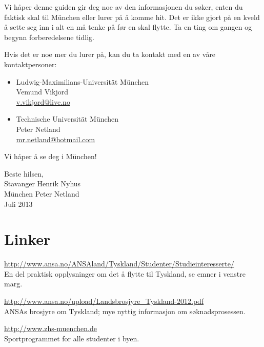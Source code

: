 \framebreak
\framebreak
\vspace{4cm}

\large
Vi håper denne guiden gir deg noe av den informasjonen du søker, enten du faktisk skal til München eller lurer på å komme hit. Det er ikke gjort på en kveld å sette seg inn i alt en må tenke på før en skal flytte. Ta en ting om gangen og begynn forberedelsene tidlig.

Hvis det er noe mer du lurer på, kan du ta kontakt med en av våre kontaktpersoner:
\begin{itemize}
\item{Ludwig-Maximilians-Universität München}\\
Vemund Vikjord \\
\href{mailto:v.vikjord@live.no}{v.vikjord@live.no} 

\item{Technische Universität München}\\
Peter Netland \\
\href{mailto:mr.netland@hotmail.com}{mr.netland@hotmail.com} 
\end{itemize}

\vspace{1cm}

Vi håper å se deg i München!


\vspace{2cm}

Beste hilsen,\\
Stavanger \hfill Henrik Nyhus \\
München \hfill Peter Netland \\
Juli 2013








\framebreak
\chapter{Linker}


\url{http://www.ansa.no/ANSAland/Tyskland/Studenter/Studieinteresserte/}\\
En del praktisk opplysninger om det å flytte til Tyskland, se emner i venstre marg.

\url{http://www.ansa.no/upload/Landsbrosjyre_Tyskland-2012.pdf} \\
ANSAs brosjyre om Tyskland; mye nyttig informasjon om søknadsprosessen.

\url{http://www.zhs-muenchen.de} \\
Sportprogrammet for alle studenter i byen.

